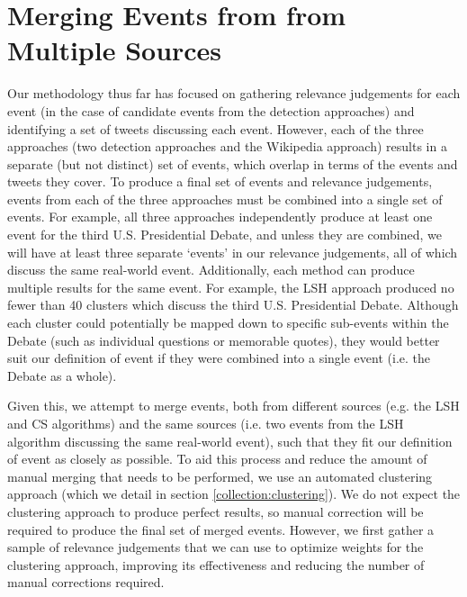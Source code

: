 \section{Merging Events from from Multiple Sources}
\label{sec:merge}
Our methodology thus far has focused on gathering relevance judgements for each event (in the case of candidate events from the detection approaches) and identifying a set of tweets discussing each event.
However, each of the three approaches (two detection approaches and the Wikipedia approach) results in a separate (but not distinct) set of events, which overlap in terms of the events and tweets they cover.
To produce a final set of events and relevance judgements, events from each of the three approaches must be combined into a single set of events.
For example, all three approaches independently produce at least one event for the third U.S. Presidential Debate, and unless they are combined, we will have at least three separate `events' in our relevance judgements, all of which discuss the same real-world event.
Additionally, each method can produce multiple results for the same event.
For example, the LSH approach produced no fewer than 40 clusters which discuss the third U.S. Presidential Debate.
Although each cluster could potentially be mapped down to specific sub-events within the Debate (such as individual questions or memorable quotes), they would better suit our definition of event if they were combined into a single event (i.e. the Debate as a whole).

Given this, we attempt to merge events, both from different sources (e.g. the LSH and CS algorithms) and the same sources (i.e. two events from the LSH algorithm discussing the same real-world event), such that they fit our definition of event as closely as possible.
To aid this process and reduce the amount of manual merging that needs to be performed, we use an automated clustering approach (which we detail in section \ref{collection:clustering}).
We do not expect the clustering approach to produce perfect results, so manual correction will be required to produce the final set of merged events.
However, we first gather a sample of relevance judgements that we can use to optimize weights for the clustering approach, improving its effectiveness and reducing the number of manual corrections required.

